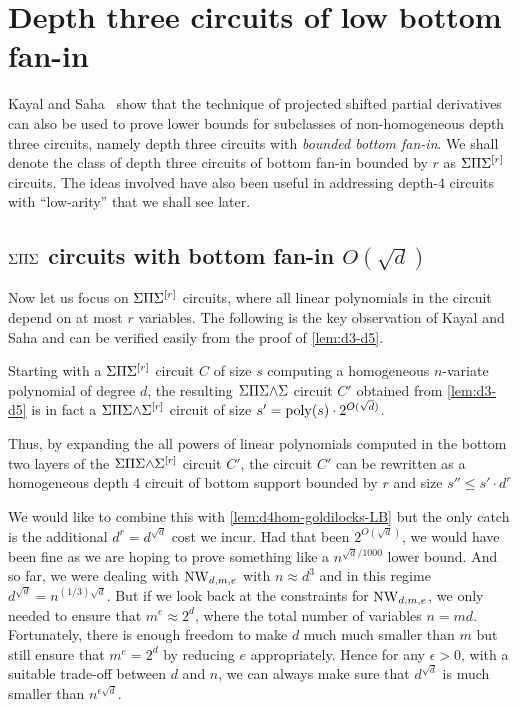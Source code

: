 \chapter{Depth three circuits of low bottom fan-in}

Kayal and Saha~\cite{KayalSaha14} show that the technique of projected shifted partial derivatives can also be used to prove lower bounds for subclasses of non-homogeneous depth three circuits, namely depth three circuits with \emph{bounded bottom fan-in}.
We shall denote the class of depth three circuits of bottom fan-in bounded by $r$ as $\Sigma\Pi\Sigma^{[r]}$ circuits.
The ideas involved have also been useful in addressing depth-$4$ circuits with ``low-arity'' \cite{KumarSaraf15,KayalSaha15} that we shall see later. 

\section{$\Sigma\Pi\Sigma$ circuits with bottom fan-in $O(\sqrt{d})$}

Now let us focus on $\Sigma\Pi\Sigma^{[r]}$ circuits, where all linear polynomials in the circuit depend on at most $r$ variables.
The following is the key observation of Kayal and Saha \cite{KayalSaha14} and can be verified easily from the proof of \autoref{lem:d3-d5}.

\begin{observation}\label{obs:d3-d5-fanin}
  Starting with a $\Sigma\Pi\Sigma^{[r]}$ circuit $C$ of size $s$ computing a homogeneous $n$-variate polynomial of degree $d$, the resulting $\Sigma\Pi\Sigma\mathord{\wedge}\Sigma$ circuit $C'$ obtained from \autoref{lem:d3-d5} is in fact a $\Sigma\Pi\Sigma\mathord{\wedge}\Sigma^{[r]}$ circuit of size $s' = \operatorname{poly}(s) \cdot 2^{O(\sqrt{d})}$.

  Thus, by expanding the all powers of linear polynomials computed in the bottom two layers of the $\Sigma\Pi\Sigma\mathord{\wedge}\Sigma^{[r]}$ circuit $C'$, the circuit $C'$ can be rewritten as a homogeneous depth $4$ circuit of bottom support bounded by $r$ and size $s'' \leq s' \cdot d^r$
\end{observation}

We would like to combine this with \autoref{lem:d4hom-goldilocks-LB} but the only catch is the additional $d^r = d^{\sqrt{d}}$ cost we incur.
Had that been $2^{O(\sqrt{d})}$, we would have been fine as we are hoping to prove something like a $n^{\sqrt{d}/1000}$ lower bound.
And so far, we were dealing with $\operatorname{\mathrm{NW}}_{d,m,e}$ with $n \approx d^3$ and in this regime $d^{\sqrt{d}} = n^{(1/3)\sqrt{d}}$.
But if we look back at the constraints for $\operatorname{\mathrm{NW}}_{d,m,e}$, we only needed to ensure that $m^e \approx 2^d$, where the total number of variables $n = md$.
Fortunately, there is enough freedom to make $d$ much much smaller than $m$ but still ensure that $m^e = 2^d$ by reducing $e$ appropriately. Hence for any $\epsilon > 0$, with a suitable trade-off between $d$ and $n$, we can always make sure that $d^{\sqrt{d}}$ is much smaller than $n^{\epsilon \sqrt{d}}$. 

